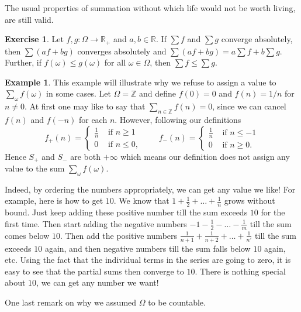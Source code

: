 \documentclass[preprint,  11pt]{amsart}
\theoremstyle{plain} %
\theoremstyle{definition} %
\newtheorem{exercise}[theorem]{Exercise}
\newtheorem{example}[theorem]{Example}
\begin{document}
The usual properties of summation without which life would not be worth living, are still valid.
\begin{exercise}\label{ex:linearitymonotonicityofsums} Let $f,g:\Omega\rightarrow \mathbb{R}_{+}$ and $a,b\in \mathbb{R}$. If $\sum f$ and $\sum g$ converge absolutely,  then  $\sum (af+bg)$ converges absolutely and $\sum (af+bg) = a\sum f +b\sum g$. Further, if $f(\omega)\le g(\omega)$ for all $\omega\in \Omega$, then $\sum f \le \sum g$.
\end{exercise}


\begin{example} This example will illustrate why we refuse to assign a value to $\sum_{\omega}f(\omega)$ in some cases. Let $\Omega=\mathbb{Z}$ and define $f(0)=0$ and $f(n)=1/n$ for $n\not=0$. At first one may like to say that $\sum_{n\in \mathbb{Z}}f(n)=0$, since we can cancel $f(n)$ and $f(-n)$ for each $n$. However, following our definitions
$$
f_{+}(n)=\begin{cases}\frac{1}{n} & \mbox{ if }n\ge 1\\ 0 &\mbox{ if }n\le 0, \end{cases} \qquad f_{-}(n)=\begin{cases}\frac{1}{n} & \mbox{ if }n\le -1\\ 0 &\mbox{ if }n\ge 0. \end{cases}
$$
Hence $S_{+}$ and $S_{-}$ are both $+\infty$ which means our definition does not assign any value to the sum $\sum_{\omega}f(\omega)$.

Indeed, by ordering the numbers appropriately, we can get any value we like! For example, here is how to get $10$. We know that $1+\frac{1}{2}+\ldots +\frac{1}{n}$ grows without bound. Just keep adding these positive number till the sum exceeds $10$ for the first time. Then start adding the negative numbers $-1-\frac{1}{2}-\ldots -\frac{1}{m}$ till the sum comes below $10$. Then add the positive numbers $\frac{1}{n+1}+\frac{1}{n+2}+\ldots +\frac{1}{n'}$ till the sum exceeds $10$ again, and then negative numbers till the sum falls below $10$ again, etc. Using the fact that the individual terms in the series are going to zero, it is easy to see that the partial sums then converge to $10$. There is nothing special about $10$, we can get any number we want!
\end{example}
One last remark on why we assumed $\Omega$ to be countable.
\end{document}
